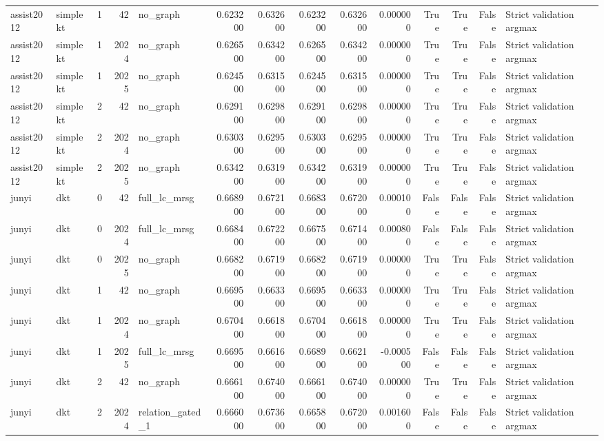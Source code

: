\begin{tabular}{llrrlrrrrrrrrl}
assist2012 & simplekt & 1 & 42 & no_graph & 0.623200 & 0.632600 & 0.623200 & 0.632600 & 0.000000 & True & True & False & Strict validation argmax \\
assist2012 & simplekt & 1 & 2024 & no_graph & 0.626500 & 0.634200 & 0.626500 & 0.634200 & 0.000000 & True & True & False & Strict validation argmax \\
assist2012 & simplekt & 1 & 2025 & no_graph & 0.624500 & 0.631500 & 0.624500 & 0.631500 & 0.000000 & True & True & False & Strict validation argmax \\
assist2012 & simplekt & 2 & 42 & no_graph & 0.629100 & 0.629800 & 0.629100 & 0.629800 & 0.000000 & True & True & False & Strict validation argmax \\
assist2012 & simplekt & 2 & 2024 & no_graph & 0.630300 & 0.629500 & 0.630300 & 0.629500 & 0.000000 & True & True & False & Strict validation argmax \\
assist2012 & simplekt & 2 & 2025 & no_graph & 0.634200 & 0.631900 & 0.634200 & 0.631900 & 0.000000 & True & True & False & Strict validation argmax \\
junyi & dkt & 0 & 42 & full_lc_mrsg & 0.668900 & 0.672100 & 0.668300 & 0.672000 & 0.000100 & False & False & False & Strict validation argmax \\
junyi & dkt & 0 & 2024 & full_lc_mrsg & 0.668400 & 0.672200 & 0.667500 & 0.671400 & 0.000800 & False & False & False & Strict validation argmax \\
junyi & dkt & 0 & 2025 & no_graph & 0.668200 & 0.671900 & 0.668200 & 0.671900 & 0.000000 & True & True & False & Strict validation argmax \\
junyi & dkt & 1 & 42 & no_graph & 0.669500 & 0.663300 & 0.669500 & 0.663300 & 0.000000 & True & True & False & Strict validation argmax \\
junyi & dkt & 1 & 2024 & no_graph & 0.670400 & 0.661800 & 0.670400 & 0.661800 & 0.000000 & True & True & False & Strict validation argmax \\
junyi & dkt & 1 & 2025 & full_lc_mrsg & 0.669500 & 0.661600 & 0.668900 & 0.662100 & -0.000500 & False & False & False & Strict validation argmax \\
junyi & dkt & 2 & 42 & no_graph & 0.666100 & 0.674000 & 0.666100 & 0.674000 & 0.000000 & True & True & False & Strict validation argmax \\
junyi & dkt & 2 & 2024 & relation_gated_1 & 0.666000 & 0.673600 & 0.665800 & 0.672000 & 0.001600 & False & False & False & Strict validation argmax \\

\end{tabular}
